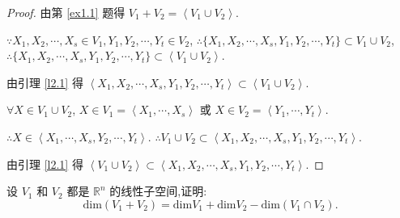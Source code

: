 \documentclass[color=black,device=normal,lang=cn,mode=geye]{elegantnote}
\begin{document}
\begin{proof}
    由第 \ref{ex1.1} 题得 $V_1+V_2=\left<V_1\cup V_2\right>$.

    $\because X_1,X_2,\cdots,X_s\in V_1,Y_1,Y_2,\cdots,Y_t\in V_2$, $\therefore\{X_1,X_2,\cdots,X_s,Y_1,Y_2,\cdots,Y_t\}\subset V_1\cup V_2$, $\therefore\{X_1,X_2,\cdots,X_s,Y_1,Y_2,\cdots,Y_t\}\subset\left<V_1\cup V_2\right>$.
    
    由引理 \ref{l2.1} 得 $\left<X_1,X_2,\cdots,X_s,Y_1,Y_2,\cdots,Y_t\right>\subset\left<V_1\cup V_2\right>$.

    $\forall X\in V_1\cup V_2$, $X\in V_1=\left<X_1,\cdots,X_s\right>$ 或 $X\in V_2=\left<Y_1,\cdots,Y_t\right>$.
    
    $\therefore X\in\left<X_1,\cdots,X_s,Y_2,\cdots,Y_t\right>$. $\therefore V_1\cup V_2\subset\left<X_1,X_2,\cdots,X_s,Y_1,Y_2,\cdots,Y_t\right>$.
    
    由引理 \ref{l2.1} 得 $\left<V_1\cup V_2\right>\subset\left<X_1,X_2,\cdots,X_s,Y_1,Y_2,\cdots,Y_t\right>$.
\end{proof}
\begin{exercise}[有改动]\label{ex1.7}
设 $V_1$ 和 $V_2$ 都是 $\mathbb{R}^n$ 的线性子空间,证明:
$$\mathrm{dim}(V_1+V_2)=\mathrm{dim}V_1+\mathrm{dim}V_2-\mathrm{dim}(V_1\cap V_2).$$
\end{exercise}
\end{document}
